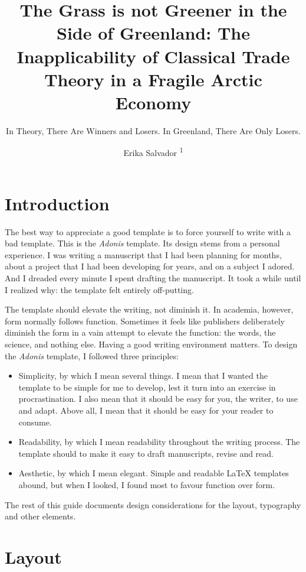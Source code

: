 \documentclass{adonis}
\title{The Grass is not Greener in the Side of Greenland: The Inapplicability of Classical Trade Theory in a Fragile Arctic Economy}
\subtitle{In Theory, There Are Winners and Losers. In Greenland, There Are Only Losers.}
\author{Erika Salvador \textsuperscript{1}}
\affiliation{\textsuperscript{1} Economics Department, Amherst College}
\begin{document}
	\maketitle
	
	\section{Introduction}
	
		The best way to appreciate a good template is to force yourself to write with a bad template.
		This is the \textit{Adonis} template.
		Its design stems from a personal experience.
		I was writing a manuscript that I had been planning for months, about a project that I had been developing for years, and on a subject I adored.
		And I dreaded every minute I spent drafting the manuscript.
		It took a while until I realized why: the template felt entirely off-putting.
		
		The template should elevate the writing, not diminish it.
		In academia, however, form normally follows function.
		Sometimes it feels like publishers deliberately diminish the form in a vain attempt to elevate the function: the words, the science, and nothing else.
		Having a good writing environment matters.
		To design the \textit{Adonis} template, I followed three principles:
		
		\begin{itemize}
			\item Simplicity, by which I mean several things.
				  I mean that I wanted the template to be simple for me to develop, lest it turn into an exercise in procrastination.
				  I also mean that it should be easy for you, the writer, to use and adapt.
				  Above all, I mean that it should be easy for your reader to consume.
			
			\item Readability, by which I mean readability throughout the writing process.
				  The template should to make it easy to draft manuscripts, revise and read.
			
			\item Aesthetic, by which I mean elegant.
				  Simple and readable \LaTeX{} templates abound, but when I looked, I found most to favour function over form.
		\end{itemize}
	
		The rest of this guide documents design considerations for the layout, typography and other elements.
	
	\section{Layout}
	
\end{document}
